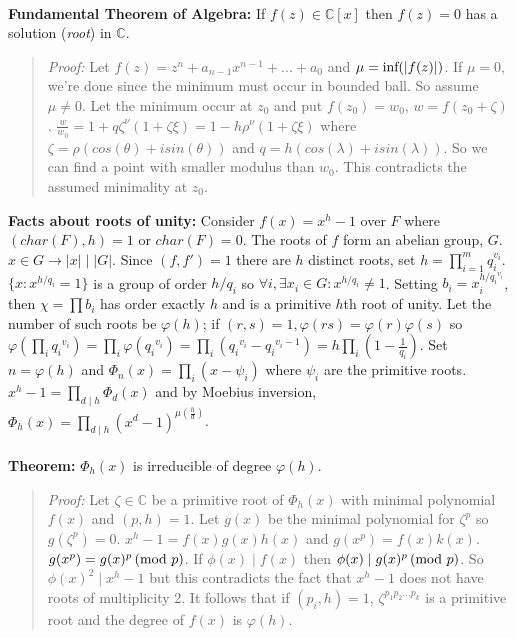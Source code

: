 \\
{\bf Fundamental Theorem of Algebra:}  If $f(z) \in {\mathbb C}[x]$ then $f(z)=0$
has a solution (\emph{root}) in ${\mathbb C}$.
\begin{quote}
\emph{Proof:}
Let $f(z)= z^n+ a_{n-1} x^{n-1} + ... + a_0$ and 
$\mu= \textnormal{inf}(|f(z)|)$.   If 
$\mu = 0$, we're done since the minimum must occur in bounded ball.  So assume
$\mu \ne 0$.  Let the minimum occur at $z_{0}$ and put
$f(z_{0})= w_{0}$,
$w=f(z_{0}+ \zeta)$.  ${\frac {w} {w_{0}}}= 1+q \zeta^{\nu}(1+\zeta \xi)=
1-h \rho^{\nu}(1+ \zeta \xi)$ where $\zeta= \rho (cos(\theta) + i sin(\theta))$ and
$q= h(cos(\lambda) + i sin(\lambda))$.  So we can find a point with smaller modulus than
$w_0$.  This contradicts the assumed minimality at $z_0$.
\end{quote}
{\bf Facts about roots of unity:}  
Consider $f(x)= x^h -1$ over $F$ where 
$(char(F),h)=1$ or $char(F)=0$.
The roots of $f$ form an abelian group, $G$.  $x \in G \rightarrow |x| \mid |G|$.  Since
$(f, f')=1$ there are $h$ distinct roots, set $h= \prod_{i=1}^m q_i^{v_i}$.  
$\{ x: x^{h/q_i} = 1 \}$ is a group of order
$h/q_i$ so $\forall i, \exists x_i \in G: 
x^{h/q_i} \ne 1$.  Setting $b_i= x_i^{h/{q_i}^{v_i}}$, then $\chi = \prod b_i$ has order
exactly $h$ and is a primitive $h$th root of unity.  
Let the number of such roots be $\varphi(h)$; if $(r,s)=1, \varphi(rs)= \varphi(r) \varphi(s)$
so $\varphi(\prod_i {q_i}^{v_i})= 
\prod_i \varphi({q_i}^{v_i})= 
\prod_i ({q_i}^{v_i}- {q_i}^{v_i-1})= h \prod_i (1- {\frac 1 {q_i}})$.  Set $n=\varphi(h)$ and
$\Phi_n(x) = \prod_i (x- \psi_i)$ where $\psi_i$ are the primitive roots.
$x^h-1 = \prod_{d \mid h} \Phi_d(x)$ and by Moebius inversion,
$\Phi_h(x)= \prod_{d \mid h} (x^d -1)^{\mu({\frac h d})}$.
\\
\\
{\bf Theorem:} $\Phi_h(x)$ is irreducible of
degree $\varphi(h)$.
\begin{quote}
\emph{Proof:} Let $\zeta \in {\mathbb C}$ be a primitive root of
$\Phi_h(x)$ with minimal polynomial $f(x)$ and $(p,h)=1$.  Let $g(x)$ be the minimal
polynomial for $\zeta^p$ so $g(\zeta^p)=0$.  $x^h -1 = f(x) g(x) h(x)$ and
$g(x^p)=f(x)k(x)$.  $g(x^p)=g(x)^p \thinspace \textnormal{(mod } p \textnormal{)}$.  If $\phi(x) \mid f(x)$ then
$\phi(x) \mid g(x)^p \thinspace \textnormal{(mod } p \textnormal{)}$.  So $\phi(x)^2 \mid x^h-1$ but this contradicts the
fact that $x^h -1$ does not have roots of multiplicity 2.  It follows that if $(p_i , h)=1$,
$\zeta^{p_1 p_2 \ldots p_k}$ is a primitive root and the degree of $f(x)$ is $\varphi(h)$.
\end{quote}
